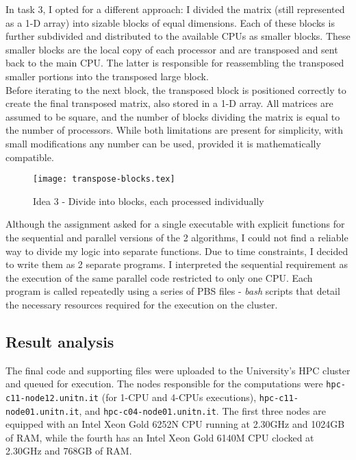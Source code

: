 In task 3, I opted for a different approach: I divided the matrix %
(still represented as a 1-D array) into sizable blocks of equal dimensions. Each of these %
blocks is further subdivided and distributed to the available CPUs as smaller blocks. %
These smaller blocks are the local copy of each processor and are transposed and %
sent back to the main CPU. The latter is responsible for reassembling the transposed %
smaller portions into the transposed large block. \\%
Before iterating to the next block, the transposed block is positioned correctly %
to create the final transposed matrix, also stored in a%
1-D array. All matrices are assumed to be square, and the number of blocks dividing the matrix %
is equal to the number of processors. While both limitations are present for simplicity, %
with small modifications any number can be used, provided it is mathematically %
compatible.
\begin{figure}[h]
    \caption{\label{image:transpose-blocks}Idea 3 - Divide into blocks, each processed individually}
    \centering
    \texttt{[image: transpose-blocks.tex]}
\end{figure}

Although the assignment asked for a single executable with explicit functions for %
the sequential and parallel versions of the 2 algorithms, I could not find a reliable %
way to divide my logic into separate functions. Due to time constraints, I decided %
to write them as 2 separate programs. I interpreted the sequential requirement as %
the execution of the same parallel code restricted to only one CPU. Each program is called %
repeatedly using a series of PBS files - \textit{bash} scripts that detail the 
necessary resources required for the execution on the cluster.

\subsection*{Result analysis}
The final code and supporting files were uploaded to the University's HPC cluster %
and queued for execution. The nodes responsible for the computations were %
\texttt{hpc-c11-node12.unitn.it} (for 1-CPU and 4-CPUs executions), %
\texttt{hpc-c11-node01.unitn.it}, and \texttt{hpc-c04-node01.unitn.it}. The first three %
nodes are equipped with an Intel\textsuperscript{\textregistered} %
Xeon\textsuperscript{\textregistered} Gold 6252N CPU running at 2.30GHz and 1024GB %
of RAM, while the fourth has an Intel\textsuperscript{\textregistered} %
Xeon\textsuperscript{\textregistered} Gold 6140M CPU clocked at 2.30GHz and 768GB %
of RAM.

